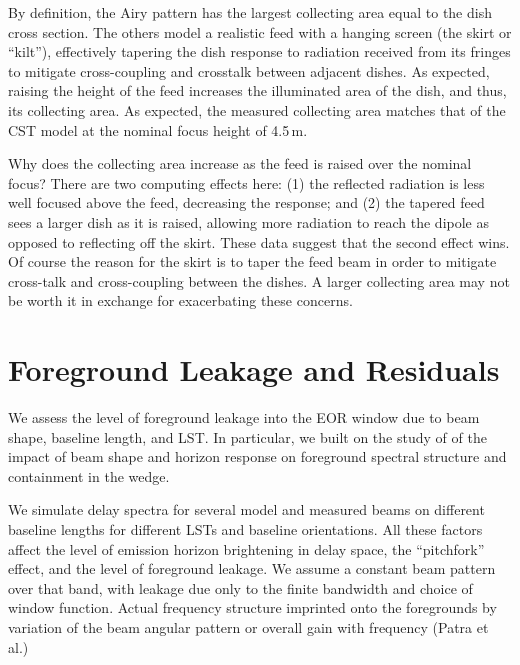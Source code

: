 \documentclass{emulateapj}
\begin{document}
By definition, the Airy pattern has the largest collecting area equal to the dish cross section. The others model a realistic feed with a hanging screen (the skirt or ``kilt''), effectively tapering the dish response to radiation received from its fringes to mitigate cross-coupling and crosstalk between adjacent dishes. As expected, raising the height of the feed increases the illuminated area of the dish, and thus, its collecting area. As expected, the measured collecting area matches that of the CST model at the nominal focus height of 4.5\,m.

Why does the collecting area increase as the feed is raised over the nominal focus? There are two computing effects here: (1) the reflected radiation is less well focused above the feed, decreasing the response; and (2) the tapered feed sees a larger dish as it is raised, allowing more radiation to reach the dipole as opposed to reflecting off the skirt. These data suggest that the second effect wins. Of course the reason for the skirt is to taper the feed beam in order to mitigate cross-talk and cross-coupling between the dishes. A larger collecting area may not be worth it in exchange for exacerbating these concerns.

\section{Foreground Leakage and Residuals}
\label{sec:foregroundleakage}

We assess the level of foreground leakage into the EOR window due to beam shape, baseline length, and LST. In particular, we built on the study of \citet{nithya15} of the impact of beam shape and horizon response on foreground spectral structure and containment in the wedge.

We simulate delay spectra for several model and measured beams on different baseline lengths for different LSTs and baseline orientations. All these factors affect the level of emission horizon brightening in delay space, the ``pitchfork'' effect, and the level of foreground leakage. We assume a constant beam pattern over that band, with leakage due only to the finite bandwidth and choice of window function. Actual frequency structure imprinted onto the foregrounds by variation of the beam angular pattern or overall gain with frequency (Patra et al.)
\end{document}
